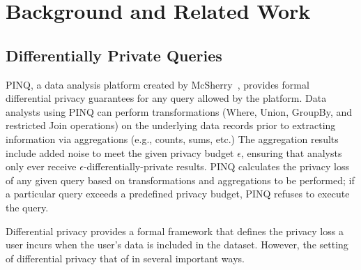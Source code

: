 \section{Background and Related Work}

\subsection{Differentially Private Queries}

PINQ, a data analysis platform created by McSherry~\cite{pinq}, provides formal differential privacy
guarantees for any query allowed by the platform.  Data analysts using PINQ can perform
transformations (Where, Union, GroupBy, and restricted Join operations) on the underlying data
records prior to extracting information via aggregations (e.g., counts, sums, etc.) The aggregation
results include added noise to meet the given privacy budget $\epsilon$, ensuring that analysts only
ever receive $\epsilon$-differentially-private results.  PINQ calculates the privacy loss of any
given query based on transformations and aggregations to be performed; if a particular query exceeds
a predefined privacy budget, PINQ refuses to execute the query.

Differential privacy provides a formal framework that defines the privacy loss a user incurs
when the user's data is included in the dataset. However, the setting of differential privacy
that of \sys{} in several important ways. 



